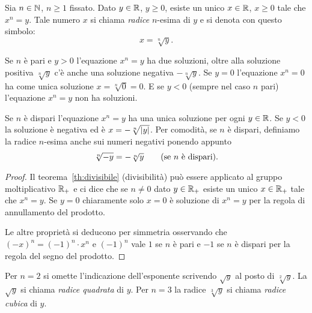 \begin{theorem}
  \label{radice!$n$-esima}%
Sia $n\in {\mathbb N}$, $n\ge 1$ fissato.
Dato $y\in {\mathbb R}$, $y \ge 0$, esiste un unico $x\in {\mathbb R}$, $x\ge 0$ tale che $x^n = y$.
Tale numero $x$ si chiama \emph{radice} $n$-esima di $y$ e si 
denota con questo simbolo:
\[
  x = \sqrt[n]{y}.
\]

Se $n$ è pari e $y>0$ l'equazione $x^n=y$ ha due soluzioni, oltre alla soluzione positiva 
$\sqrt[n]{y}$ c'è anche una soluzione negativa $-\sqrt[n]{y}$.
Se $y=0$ l'equazione $x^n=0$ ha come unica soluzione $x=\sqrt[n]{0}=0$.
E se $y<0$ (sempre nel caso $n$ pari) l'equazione $x^n = y$ non ha soluzioni.

Se $n$ è dispari l'equazione $x^n=y$ ha una unica soluzione per ogni $y\in {\mathbb R}$.
Se $y<0$ la soluzione è negativa ed è $x=-\sqrt[n]{{\left|y\right|}}$.
Per comodità, se $n$ è dispari, definiamo la radice $n$-esima anche sui numeri negativi 
ponendo appunto 
\[
  \sqrt[n]{-y} =  -\sqrt[n]{y}\qquad\text{(se $n$ è dispari).}
\]
\end{theorem}
\begin{proof}
Il teorema~\ref{th:divisibile} (divisibilità) può essere applicato al gruppo moltiplicativo 
${\mathbb R}_+$ e ci dice che se $n\neq 0$ dato $y\in {\mathbb R}_+$ esiste un unico $x\in {\mathbb R}_+$ tale 
che $x^n = y$. Se $y=0$ chiaramente solo $x=0$ è soluzione di $x^n= y$ per la regola 
di annullamento del prodotto. 

Le altre proprietà si deducono per simmetria osservando che $(-x)^n = (-1)^n\cdot x^n$
e $(-1)^n$ vale $1$ se $n$ è pari e $-1$ se $n$ è dispari per la regola del segno 
del prodotto.
\end{proof}

%
%
Per $n=2$ si omette l'indicazione dell'esponente scrivendo $\sqrt y$ al posto di $\sqrt[2] y$.
La $\sqrt y$ si chiama \emph{radice quadrata} di $y$.
Per $n=3$ la radice $\sqrt[3]{y}$ si chiama \emph{radice cubica} di $y$.

